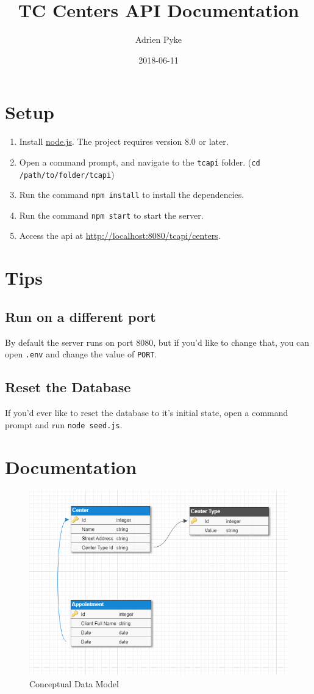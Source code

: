 \documentclass{article}
\title{TC Centers API Documentation}
\date{2018-06-11}
\author{Adrien Pyke}
\begin{document}
	\maketitle
	\newpage

	\section{Setup}
	\begin{enumerate}
		\item Install \href{https://nodejs.org/en/}{node.js}. The project requires version 8.0 or later.
		\item Open a command prompt, and navigate to the \texttt{tcapi} folder. (\texttt{cd /path/to/folder/tcapi})
		\item Run the command \texttt{npm install} to install the dependencies.
		\item Run the command \texttt{npm start} to start the server.
		\item Access the api at \url{http://localhost:8080/tcapi/centers}.
	\end{enumerate}

	\section{Tips}

	\subsection{Run on a different port}
	By default the server runs on port 8080, but if you'd like to change that, you can open \texttt{.env} and change the value of \texttt{PORT}.

	\subsection{Reset the Database}
	If you'd ever like to reset the database to it's initial state, open a command prompt and run \texttt{node seed.js}.

	\newpage

	\section{Documentation}
	\begin{figure}[h!]
		\includegraphics[width=\linewidth]{data-model.png}
		\caption{Conceptual Data Model}
		\label{fig:datamodel}
	\end{figure}
\end{document}
